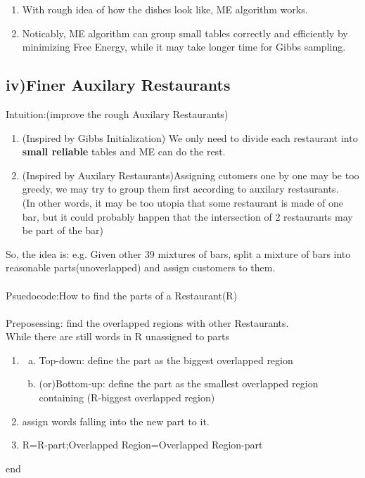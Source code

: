 \documentclass{article}
\begin{document}
\begin{spacing}{1.1}
\begin{center}
\end{center}
\begin{enumerate}
\item With rough idea of how the dishes look like, ME algorithm works.
\item Noticably, ME algorithm can group small tables correctly and efficiently by minimizing Free Energy, while it may take longer time for Gibbs sampling.
\end{enumerate}



\subsection{iv)Finer Auxilary Restaurants}
Intuition:(improve the rough Auxilary Restaurants)\\
\begin{enumerate}
\item (Inspired by Gibbs Initialization) We only need to divide each restaurant into {\bf small reliable} tables and ME can do the rest.\\
\item (Inspired by Auxilary Restaurants)Assigning cutomers one by one may be too greedy, we may try to group them first according to auxilary restaurants.\\
(In other words, it may be too utopia that some restaurant is made of one bar, but it could probably happen that the intersection of 2 restaurants may be part of the bar)
\end{enumerate}
So, the idea is: e.g. Given other 39 mixtures of bars, split a mixture of bars into reasonable parts(unoverlapped) and assign customers to them.\\ \\

Psuedocode:How to find the parts of a Restaurant(R)\\ \\
Preposessing: find the overlapped regions with other Restaurants.\\
While there are still words in R unassigned to parts
\begin{enumerate}
\item 
\begin{enumerate}[(a)]
\item Top-down: define the part as the biggest overlapped region
\item (or)Bottom-up: define the part as the smallest overlapped region containing (R-biggest overlapped region)
\end{enumerate}
\item assign words falling into the new part to it.
\item R=R-part;Overlapped Region=Overlapped Region-part
\end{enumerate}
end\\ \\


\end{spacing}
\end{document}
